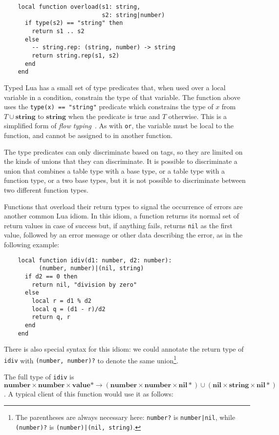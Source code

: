 \documentclass{sig-alternate}
\newcommand{\Top}{\mathbf{value}}
\newcommand{\Nil}{\mathbf{nil}}
\newcommand{\Number}{\mathbf{number}}
\newcommand{\String}{\mathbf{string}}
\begin{document}
\begin{verbatim}
    local function overload(s1: string, 
                            s2: string|number)
      if type(s2) == "string" then
        return s1 .. s2
      else
        -- string.rep: (string, number) -> string
        return string.rep(s1, s2)
      end
    end
\end{verbatim}

Typed Lua has a small set of type predicates that, when used
over a local variable in a condition, constrain the type of that
variable. The function above uses the {\tt type(x) == "string"}
predicate which constrains the type of $x$ from $T \cup \String$ to
$\String$ when the predicate is true and $T$ otherwise.
This is a simplified form of {\em flow 
typing}~\cite{guha:flow,tobin:occur}. As with {\tt or}, the
variable must be local to the function, and cannot be assigned
to in another function.

The type predicates can only discriminate based on tags, so they
are limited on the kinds of unions that they can discriminate. It
is possible to discriminate a union that combines a table type with
a base type, or a table type with a function type, or a two base types,
but it is not possible to discriminate between two different function
types.

Functions that overload their return types to signal the occurrence
of errors are another common Lua idiom. In this idiom, a function
returns its normal set of return values in case of success but,
if anything fails, returns {\tt nil} as the first value, followed
by an error message or other data describing the error, as in the
following example:

\begin{verbatim}
    local function idiv(d1: number, d2: number):
          (number, number)|(nil, string)
      if d2 == 0 then
        return nil, "division by zero"
      else
        local r = d1 % d2
        local q = (d1 - r)/d2
        return q, r
      end
    end
\end{verbatim}

There is also special syntax for this idiom: we could
annotate the return type of {\tt idiv} with {\tt (number, number)?}
to denote the same union\footnote{The parentheses are always
necessary here: {\tt number?} is {\tt number|nil}, while {\tt (number)?}
is {\tt (number)|(nil, string)}.}. 

The full type of {\tt idiv} is $\Number \times \Number \times
\Top * \rightarrow (\Number \times \Number \times \Nil *) \cup
(\Nil \times \String \times \Nil *)$. A typical client of this
function would use it as follows:
\end{document}
